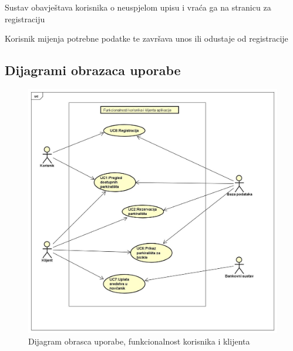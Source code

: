 {\begin{packed_item}
\begin{packed_item}
\begin{packed_enum}
			\item {Sustav obavještava korisnika o neuspjelom upisu i vraća ga na stranicu za registraciju} 
			
			\item {Korisnik mijenja potrebne podatke te završava unos ili odustaje od registracije}
		\end{packed_enum}
		
	\end{packed_item}
	
\end{packed_item}

\newpage

\subsection{Dijagrami obrazaca uporabe}



\begin{figure}[!htb]
	\centering
	\includegraphics[width=1\linewidth]{dijagrami/dijagramKlijent.jpg}
	\caption{ Dijagram obrasca uporabe, funkcionalnost korisnika i klijenta}
	\label{fig:dijagramklijent}
	
\end{figure}

}
